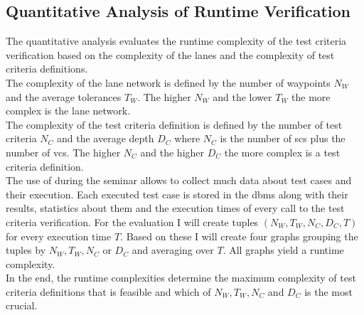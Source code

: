 \subsection{Quantitative Analysis of Runtime Verification}
The quantitative analysis evaluates the runtime complexity of the test criteria verification based on the complexity of the lanes and the complexity of test criteria definitions.\\
The complexity of the lane network is defined by the number of waypoints \(N_W\) and the average tolerances \(T_W\).
The higher \(N_W\) and the lower \(T_W\) the more complex is the lane network.\\
The complexity of the test criteria definition is defined by the number of test criteria \(N_C\) and the average depth \(D_C\) where \(N_C\) is the number of \glspl{sc} plus the number of \glspl{vc}.
The higher \(N_C\) and the higher \(D_C\) the more complex is a test criteria definition.\\
The use of \drivebuild{} during the seminar allows to collect much data about test cases and their execution.
Each executed test case is stored in the \gls{dbms} along with their results, statistics about them and the execution times of every call to the test criteria verification.
For the evaluation I will create tuples \((N_W, T_W, N_C, D_C, T)\) for every execution time \(T\).
Based on these I will create four graphs grouping the tuples by \(N_W, T_W, N_C\) or \(D_C\) and averaging over \(T\).
All graphs yield a runtime complexity.\\
In the end, the runtime complexities determine the maximum complexity of test criteria definitions that is feasible and which of \(N_W, T_W, N_C\) and \(D_C\) is the most crucial.


